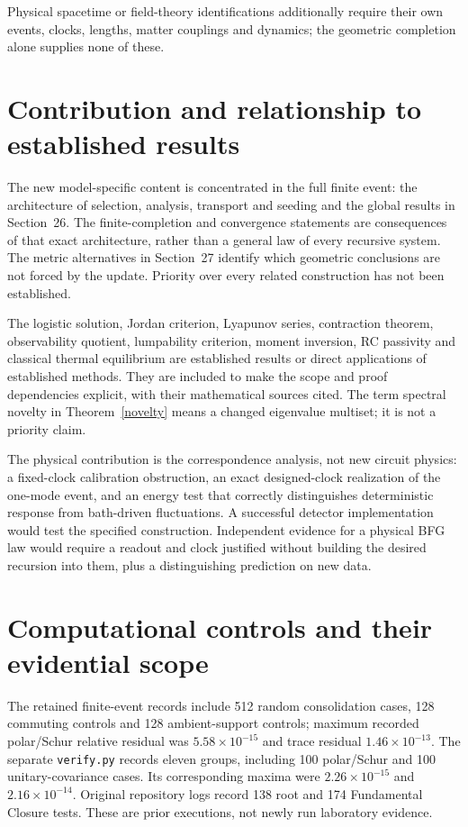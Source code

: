 \documentclass[11pt,letterpaper]{article}
\theoremstyle{definition}
\numberwithin{equation}{section}
\begin{document}
Physical spacetime or field-theory identifications additionally require their own events, clocks, lengths, matter couplings and dynamics; the geometric completion alone supplies none of these.

\section{Contribution and relationship to established results}
The new model-specific content is concentrated in the full finite event: the architecture of selection, analysis, transport and seeding and the global results in Section~26. The finite-completion and convergence statements are consequences of that exact architecture, rather than a general law of every recursive system. The metric alternatives in Section~27 identify which geometric conclusions are not forced by the update. Priority over every related construction has not been established.

The logistic solution, Jordan criterion, Lyapunov series, contraction theorem, observability quotient, lumpability criterion, moment inversion, RC passivity and classical thermal equilibrium are established results or direct applications of established methods. They are included to make the scope and proof dependencies explicit, with their mathematical sources cited. The term spectral novelty in Theorem~\ref{novelty} means a changed eigenvalue multiset; it is not a priority claim.

The physical contribution is the correspondence analysis, not new circuit physics: a fixed-clock calibration obstruction, an exact designed-clock realization of the one-mode event, and an energy test that correctly distinguishes deterministic response from bath-driven fluctuations. A successful detector implementation would test the specified construction. Independent evidence for a physical BFG law would require a readout and clock justified without building the desired recursion into them, plus a distinguishing prediction on new data.

\section{Computational controls and their evidential scope}
The retained finite-event records include 512 random consolidation cases, 128 commuting controls and 128 ambient-support controls; maximum recorded polar/Schur relative residual was $5.58\times10^{-15}$ and trace residual $1.46\times10^{-13}$. The separate \texttt{verify.py} records eleven groups, including 100 polar/Schur and 100 unitary-covariance cases. Its corresponding maxima were $2.26\times10^{-15}$ and $2.16\times10^{-14}$. Original repository logs record 138 root and 174 Fundamental Closure tests. These are prior executions, not newly run laboratory evidence.
\end{document}
